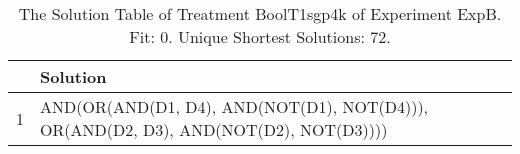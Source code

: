 \begin{table}[ht]
\centering
\begin{tabular}{rp{9cm}}
  \hline
 & Solution \\ 
  \hline
1 & AND(OR(AND(D1, D4), AND(NOT(D1), NOT(D4))), OR(AND(D2, D3), AND(NOT(D2), NOT(D3)))) \\ 
   \hline
\end{tabular}
\caption{The Solution Table of Treatment BoolT1sgp4k of Experiment ExpB. Fit: 0. Unique Shortest Solutions: 72.} 
\end{table}
